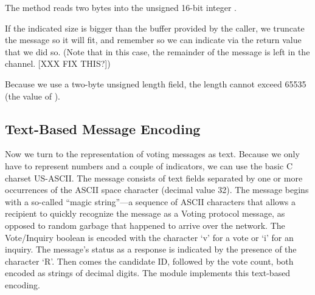 
\begin{topcode}

\begin{bottomcode}
%
The  method reads two bytes into the unsigned 16-bit
integer .
%

If the indicated size is bigger than the buffer provided by the
caller, we truncate the message so it will fit, and remember so 
we can indicate via the return value that we did so.
(Note that in this case, the remainder of the message is left in the
channel. [XXX FIX THIS?])

\end{bottomcode}

\begin{bottomcode}
Because we use a two-byte unsigned length field, the length cannot exceed
65535 (the value of ).
%
\end{bottomcode}
\end{topcode}


\subsection{Text-Based Message Encoding}
\label{sect:textEncoding}%

Now we turn to the representation of voting messages as text.
Because we only have to represent numbers and a couple of
indicators, we can use the basic C charset US-ASCII.
The message consists of text fields separated by one or more
occurrences of the ASCII space character (decimal value 32).
The message begins with a so-called ``magic string''---a
sequence of ASCII characters that allows a recipient to quickly recognize
the message as a Voting protocol message, as opposed to random garbage
that happened to arrive over the network.  The Vote/Inquiry boolean is
encoded with the character `v' for a vote or `i' for an inquiry.  The
message's status as a response is indicated by the presence of the
character `R'.  Then comes the candidate ID, followed by the vote
count, both encoded as strings of decimal digits.
The module  implements
this text-based encoding.

